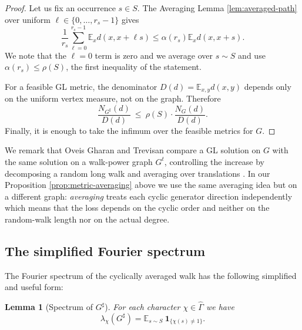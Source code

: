 \documentclass[11pt]{article}
\newtheorem{lemma}[theorem]{Lemma}
\theoremstyle{definition}
\theoremstyle{remark}
\newtheorem{remark}[theorem]{Remark}
\newcommand{\E}{\mathbb{E}}
\newcommand{\one}{\mathbf{1}}
\newcommand{\Gammahat}{\widehat{\Gamma}}
\begin{document}
\begin{proof}
Let us fix an occurrence $s\in S$. The Averaging Lemma \ref{lem:averaged-path} over uniform $\ell \in\{0,\ldots,r_s-1\}$ gives
\[
  \frac{1}{r_s}\sum_{\ell=0}^{r_s-1}
  \E_xd(x,x+\ell s)
  \leq \alpha(r_s)\E_xd(x,x+s).
\]
We note that the $\ell = 0$ term is zero and we average over $s\sim S$ and use $\alpha(r_s)\le\rho(S)$, the first inequality of the statement.

For a feasible GL metric, the denominator $D(d)=\E_{x,y}d(x,y)$ depends only on the uniform vertex measure, not on the graph. Therefore
\[
  \frac{N_{G^\sharp}(d)}{D(d)}
  ~\leq~ \rho(S) \cdot \frac{N_G(d)}{D(d)}.
\]
Finally, it is enough to take the infimum over the feasible metrics for $G$.
\end{proof}



We remark that  Oveis Gharan  and Trevisan compare a GL solution on $G$ with the same solution on a walk-power graph $G^t$, controlling the increase by decomposing a random long walk and averaging over translations \cite{Trevisan21}. In our Proposition \ref{prop:metric-averaging} above we use the same  averaging idea but on a different graph: \emph{averaging} treats each cyclic generator direction independently which means that the loss depends on the cyclic order and neither on the random-walk length nor on the actual degree.



\subsection{The simplified Fourier spectrum}
The Fourier spectrum of the cyclically averaged walk has the following simplified and useful form:

\begin{lemma}[Spectrum of $G^\sharp$]\label{lem:saturated-spectrum}
For each character $\chi\in\Gammahat$ we have
\begin{equation}\label{eq:saturated-spectrum}
  \lambda_\chi(G^\sharp)
  =\E_{s\sim S} ~\one_{\{\chi(s)\neq 1\}}.
\end{equation}
\end{lemma}
\end{document}
